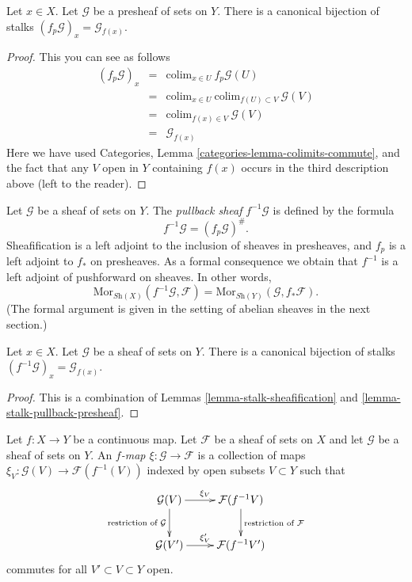 \begin{lemma}
\label{lemma-stalk-pullback-presheaf}
Let $x \in X$. Let $\mathcal{G}$ be a presheaf of sets on $Y$.
There is a canonical bijection of stalks
$(f_p\mathcal{G})_x = \mathcal{G}_{f(x)}$.
\end{lemma}

\begin{proof}
This you can see as follows
\begin{eqnarray*}
(f_p\mathcal{G})_x
& = &
\text{colim}_{x \in U}\ f_p\mathcal{G}(U) \\
& = &
\text{colim}_{x \in U}\ \text{colim}_{f(U) \subset V}\ \mathcal{G}(V) \\
& = &
\text{colim}_{f(x) \in V}\ \mathcal{G}(V) \\
& = &
\mathcal{G}_{f(x)}
\end{eqnarray*}
Here we have used
Categories, Lemma \ref{categories-lemma-colimits-commute},
and the fact that any $V$ open in $Y$ containing $f(x)$
occurs in the third description above (left to the reader).
\end{proof}

\noindent
Let $\mathcal{G}$ be a sheaf of sets on $Y$.
The {\it pullback sheaf} $f^{-1}\mathcal{G}$ is defined
by the formula
$$
f^{-1}\mathcal{G} = (f_p\mathcal{G})^\# .
$$
Sheafification is a left adjoint to the inclusion
of sheaves in presheaves, and $f_p$ is a left
adjoint to $f_*$ on presheaves. As a formal consequence
we obtain that $f^{-1}$ is a left adjoint of
pushforward on sheaves. In other words,
$$
\text{Mor}_{\textit{Sh}(X)}(f^{-1}\mathcal{G}, \mathcal{F})
=
\text{Mor}_{\textit{Sh}(Y)}(\mathcal{G}, f_*\mathcal{F}).
$$
(The formal argument is given in the setting of abelian
sheaves in the next section.)

\begin{lemma}
\label{lemma-stalk-pullback}
Let $x \in X$. Let $\mathcal{G}$ be a sheaf of sets on $Y$.
There is a canonical bijection of stalks
$(f^{-1}\mathcal{G})_x = \mathcal{G}_{f(x)}$.
\end{lemma}

\begin{proof}
This is a combination of Lemmas \ref{lemma-stalk-sheafification}
and \ref{lemma-stalk-pullback-presheaf}.
\end{proof}

\begin{definition}
\label{definition-f-map}
Let $f : X \to Y$ be a continuous map.
Let $\mathcal{F}$ be a sheaf of sets on $X$ and
let $\mathcal{G}$ be a sheaf of sets on $Y$.
An {\it $f$-map $\xi : \mathcal{G} \to \mathcal{F}$}
is a collection of maps
$\xi_V : \mathcal{G}(V) \to \mathcal{F}(f^{-1}(V))$
indexed by open subsets $V \subset Y$ such that
$$
\xymatrix{
\mathcal{G}(V) \ar[r]^{\xi_V} \ar[d]_{\text{restriction of }\mathcal{G}} &
\mathcal{F}(f^{-1}V) \ar[d]^{\text{restriction of }\mathcal{F}} \\
\mathcal{G}(V') \ar[r]^{\xi_V'} &
\mathcal{F}(f^{-1}V')
}
$$
commutes for all $V' \subset V \subset Y$ open.
\end{definition}

